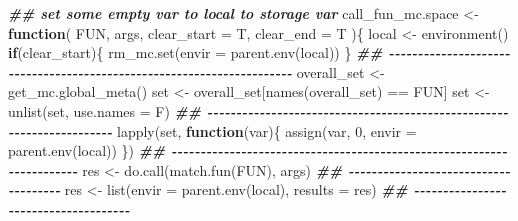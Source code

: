 \documentclass[
]{article}
\newenvironment{Shaded}{\begin{snugshade}}{\end{snugshade}}
\newcommand{\AttributeTok}[1]{\textcolor[rgb]{0.77,0.63,0.00}{#1}}
\newcommand{\ControlFlowTok}[1]{\textcolor[rgb]{0.13,0.29,0.53}{\textbf{#1}}}
\newcommand{\DecValTok}[1]{\textcolor[rgb]{0.00,0.00,0.81}{#1}}
\newcommand{\DocumentationTok}[1]{\textcolor[rgb]{0.56,0.35,0.01}{\textbf{\textit{#1}}}}
\newcommand{\FunctionTok}[1]{\textcolor[rgb]{0.00,0.00,0.00}{#1}}
\newcommand{\NormalTok}[1]{#1}
\newcommand{\OtherTok}[1]{\textcolor[rgb]{0.56,0.35,0.01}{#1}}
\newcommand{\SpecialCharTok}[1]{\textcolor[rgb]{0.00,0.00,0.00}{#1}}
\begin{document}
\begin{Shaded}
\begin{Highlighting}[]
\DocumentationTok{\#\# set some empty var to local to storage var}
\NormalTok{call\_fun\_mc.space }\OtherTok{\textless{}{-}} 
  \ControlFlowTok{function}\NormalTok{(}
\NormalTok{           FUN,}
\NormalTok{           args,}
           \AttributeTok{clear\_start =}\NormalTok{ T,}
           \AttributeTok{clear\_end =}\NormalTok{ T}
\NormalTok{           )\{}
\NormalTok{    local }\OtherTok{\textless{}{-}} \FunctionTok{environment}\NormalTok{()}
    \ControlFlowTok{if}\NormalTok{(clear\_start)\{}
      \FunctionTok{rm\_mc.set}\NormalTok{(}\AttributeTok{envir =} \FunctionTok{parent.env}\NormalTok{(local))}
\NormalTok{    \}}
    \DocumentationTok{\#\# {-}{-}{-}{-}{-}{-}{-}{-}{-}{-}{-}{-}{-}{-}{-}{-}{-}{-}{-}{-}{-}{-}{-}{-}{-}{-}{-}{-}{-}{-}{-}{-}{-}{-}{-}{-}{-}{-}{-}{-}{-}{-}{-}{-}{-}{-}{-}{-}{-}{-}{-}{-}{-}{-}{-}{-}{-}{-}{-}{-}{-}{-}{-}{-}{-}{-}{-}{-}{-}{-} }
\NormalTok{    overall\_set }\OtherTok{\textless{}{-}} \FunctionTok{get\_mc.global\_meta}\NormalTok{()}
\NormalTok{    set }\OtherTok{\textless{}{-}}\NormalTok{ overall\_set[}\FunctionTok{names}\NormalTok{(overall\_set) }\SpecialCharTok{==}\NormalTok{ FUN]}
\NormalTok{    set }\OtherTok{\textless{}{-}} \FunctionTok{unlist}\NormalTok{(set, }\AttributeTok{use.names =}\NormalTok{ F) }
    \DocumentationTok{\#\# {-}{-}{-}{-}{-}{-}{-}{-}{-}{-}{-}{-}{-}{-}{-}{-}{-}{-}{-}{-}{-}{-}{-}{-}{-}{-}{-}{-}{-}{-}{-}{-}{-}{-}{-}{-}{-}{-}{-}{-}{-}{-}{-}{-}{-}{-}{-}{-}{-}{-}{-}{-}{-}{-}{-}{-}{-}{-}{-}{-}{-}{-}{-}{-}{-}{-}{-}{-}{-}{-} }
    \FunctionTok{lapply}\NormalTok{(set, }\ControlFlowTok{function}\NormalTok{(var)\{}
             \FunctionTok{assign}\NormalTok{(var, }\DecValTok{0}\NormalTok{, }\AttributeTok{envir =} \FunctionTok{parent.env}\NormalTok{(local))}
\NormalTok{    \})}
    \DocumentationTok{\#\# {-}{-}{-}{-}{-}{-}{-}{-}{-}{-}{-}{-}{-}{-}{-}{-}{-}{-}{-}{-}{-}{-}{-}{-}{-}{-}{-}{-}{-}{-}{-}{-}{-}{-}{-}{-}{-}{-}{-}{-}{-}{-}{-}{-}{-}{-}{-}{-}{-}{-}{-}{-}{-}{-}{-}{-}{-}{-}{-}{-}{-}{-}{-}{-}{-}{-}{-}{-}{-}{-}}
\NormalTok{    res }\OtherTok{\textless{}{-}} \FunctionTok{do.call}\NormalTok{(}\FunctionTok{match.fun}\NormalTok{(FUN), args)}
    \DocumentationTok{\#\# {-}{-}{-}{-}{-}{-}{-}{-}{-}{-}{-}{-}{-}{-}{-}{-}{-}{-}{-}{-}{-}{-}{-}{-}{-}{-}{-}{-}{-}{-}{-}{-}{-}{-}{-}{-}{-} }
\NormalTok{    res }\OtherTok{\textless{}{-}} \FunctionTok{list}\NormalTok{(}\AttributeTok{envir =} \FunctionTok{parent.env}\NormalTok{(local), }\AttributeTok{results =}\NormalTok{ res)}
    \DocumentationTok{\#\# {-}{-}{-}{-}{-}{-}{-}{-}{-}{-}{-}{-}{-}{-}{-}{-}{-}{-}{-}{-}{-}{-}{-}{-}{-}{-}{-}{-}{-}{-}{-}{-}{-}{-}{-}{-}{-} }

\end{Highlighting}
\end{Shaded}
\end{document}
